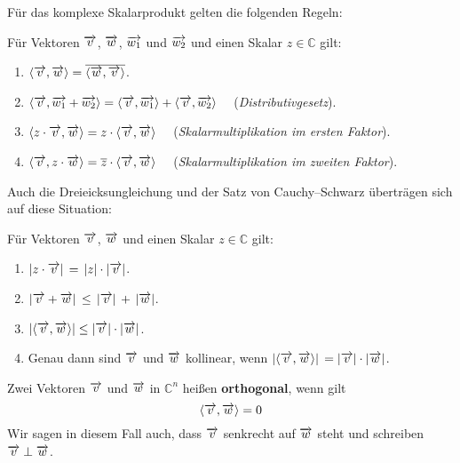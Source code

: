 Für das komplexe Skalarprodukt gelten die folgenden Regeln:

\begin{regel}\label{regel_skalar_produkt_komplex} 
Für Vektoren $\overrightarrow{v}$, $\overrightarrow{w}$, 
$\overrightarrow{w_1}$ und $\overrightarrow{w_2}$ und einen Skalar $z \in \mathbb C$ gilt:
\begin{enumerate}
\item $\langle \overrightarrow{v}, \overrightarrow{w} \rangle = \overline{\langle \overrightarrow{w}, 
\overrightarrow{v} \rangle}$.
\item $\langle \overrightarrow{v}, \overrightarrow{w_1} + \overrightarrow{w_2} \rangle = 
\langle \overrightarrow{v}, \overrightarrow{w_1} \rangle + \langle \overrightarrow{v}, 
\overrightarrow{w_2} \rangle \quad$ (\textit{Distributivgesetz}).
\item $\langle z \cdot \overrightarrow{v}, \overrightarrow{w} \rangle = z \cdot \langle \overrightarrow{v}, 
\overrightarrow{w} \rangle \quad$ (\textit{Skalarmultiplikation im ersten Faktor}).
\item $\langle \overrightarrow{v}, z \cdot \overrightarrow{w} \rangle = 
\overline{z} \cdot \langle \overrightarrow{v}, 
\overrightarrow{w} \rangle \quad$ (\textit{Skalarmultiplikation im zweiten Faktor}).
\end{enumerate}
\end{regel}

Auch die Dreieicksungleichung und der Satz 
von Cauchy--Schwarz überträgen sich auf diese Situation:

\begin{satz}\label{cauchy_schwarz_komplex}
Für Vektoren $\overrightarrow{v}$, $\overrightarrow{w}$ und einen Skalar $z \in \mathbb C$ gilt:

\begin{enumerate}
\item $\vert z \cdot \overrightarrow{v} \vert \, = \, \vert z \vert \cdot \vert \overrightarrow{v} \vert$.
\item $\vert \overrightarrow{v} + \overrightarrow{w} \vert \, \leq \, \vert \overrightarrow{v} \vert \, + 
     \, \vert \overrightarrow{w} \vert$.
\item $ \vert \langle \overrightarrow{v},  \overrightarrow{w} \rangle \vert \leq \vert \overrightarrow{v} 
        \vert \cdot \vert \overrightarrow{w} \vert $.
\item Genau dann sind $\overrightarrow{v}$ und $\overrightarrow{w}$ kollinear, wenn 
$\vert \langle \overrightarrow{v}, \overrightarrow{w} \rangle \vert \, 
= \vert \overrightarrow{v} \vert \cdot  \vert \overrightarrow{w} \vert$.
\end{enumerate}
\end{satz}

\begin{definition} Zwei Vektoren $\overrightarrow{v}$ und $\overrightarrow{w}$ in  $\mathbb C^n$ heißen 
 \textbf{orthogonal}, wenn gilt
  	$$ \langle \overrightarrow{v},  \overrightarrow{w} \rangle = 0 $$
Wir sagen in diesem Fall auch, dass $\overrightarrow{v}$ senkrecht auf $\overrightarrow{w}$ steht und schreiben 
$\overrightarrow{v} \perp \overrightarrow{w}$.
\end{definition}

